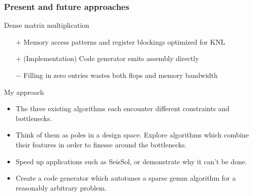 \documentclass[9pt]{beamer}
\begin{document}
\begin{frame}
  \frametitle{Present and future approaches}
  \begin{block}{Dense matrix multiplication}
    \begin{itemize}
    \item[$+$] Memory access patterns and register blockings optimized for KNL
    \item[$+$] (Implementation) Code generator emits assembly directly 
    \item[$-$] Filling in zero entries wastes both flops and memory bandwidth
    \end{itemize}
  \end{block}

  \begin{block}{My approach}
    \begin{itemize}
    \item The three existing algorithms each encounter different constraints and bottlenecks.
    \item Think of them as poles in a design space. Explore algorithms which combine their features in order to finesse around the bottlenecks.
    \item Speed up applications such as SeisSol, or demonstrate why it can't be done.
    \item Create a code generator which autotunes a sparse gemm algorithm for a reasonably arbitrary problem.
    \end{itemize}
  \end{block}
\end{frame}
\end{document}
